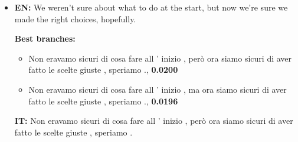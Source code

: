 \begin{itemize}
    \item \textbf{EN:} We weren't sure about what to do at the start, but now we're sure we made the right choices, hopefully.
    
    \textbf{Best branches:}
    \begin{itemize}
        \item Non eravamo sicuri di cosa fare all ' inizio , però ora siamo sicuri di aver fatto le scelte giuste , speriamo ., \textbf{0.0200}
        \item Non eravamo sicuri di cosa fare all ' inizio , ma ora siamo sicuri di aver fatto le scelte giuste , speriamo .,\textbf{ 0.0196}
    \end{itemize}
    \textbf{IT:} Non eravamo sicuri di cosa fare all ' inizio , però ora siamo sicuri di aver fatto le scelte giuste , speriamo .

\end{itemize}